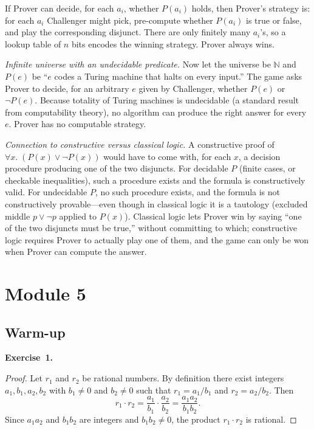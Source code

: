 \documentclass[11pt]{article}
\begin{document}
If Prover can decide, for each $a_i$, whether $P(a_i)$ holds, then
Prover's strategy is: for each $a_i$ Challenger might pick, pre-compute
whether $P(a_i)$ is true or false, and play the corresponding disjunct.
There are only finitely many $a_i$'s, so a lookup table of $n$ bits
encodes the winning strategy.  Prover always wins.

\emph{Infinite universe with an undecidable predicate.}  Now let the
universe be $\mathbb{N}$ and $P(e)$ be ``$e$ codes a Turing machine
that halts on every input.''  The game asks Prover to decide, for an
arbitrary $e$ given by Challenger, whether $P(e)$ or $\lnot P(e)$.
Because totality of Turing machines is undecidable (a standard result
from computability theory), no algorithm can produce the right answer
for every $e$.  Prover has no computable strategy.

\emph{Connection to constructive versus classical logic.}  A
constructive proof of $\forall x.\; (P(x) \vee \lnot P(x))$ would
have to come with, for each $x$, a decision procedure producing one
of the two disjuncts.  For decidable $P$ (finite cases, or checkable
inequalities), such a procedure exists and the formula is
constructively valid.  For undecidable $P$, no such procedure exists,
and the formula is not constructively provable---even though in
classical logic it is a tautology (excluded middle $p \vee \lnot p$
applied to $P(x)$).  Classical logic lets Prover win by saying ``one
of the two disjuncts must be true,'' without committing to which;
constructive logic requires Prover to actually play one of them, and
the game can only be won when Prover can compute the answer.

\section*{Module 5}

\subsection*{Warm-up}

\textbf{Exercise~1.}
\begin{proof}
Let $r_1$ and $r_2$ be rational numbers. By definition there exist integers
$a_1, b_1, a_2, b_2$ with $b_1 \neq 0$ and $b_2 \neq 0$ such that
$r_1 = a_1/b_1$ and $r_2 = a_2/b_2$. Then
\[
  r_1 \cdot r_2 = \frac{a_1}{b_1} \cdot \frac{a_2}{b_2}
               = \frac{a_1 a_2}{b_1 b_2}.
\]
Since $a_1 a_2$ and $b_1 b_2$ are integers and $b_1 b_2 \neq 0$, the product
$r_1 \cdot r_2$ is rational.
\end{proof}
\end{document}
